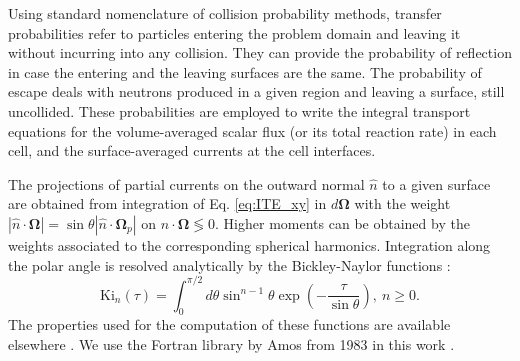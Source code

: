\documentclass{ictt26}
\begin{document}
Using standard nomenclature of collision probability methods, transfer probabilities refer to particles entering the problem domain and leaving it without incurring into any collision. They can provide the probability of reflection in case the entering and the leaving surfaces are the same. The probability of escape deals with neutrons produced in a given region and leaving a surface, still uncollided. These probabilities are employed to write the integral transport equations for the volume-averaged scalar flux (or its total reaction rate) in each cell, and the surface-averaged currents at the cell interfaces.

The projections of partial currents on the outward normal $\hat{n}$ to a given surface are obtained from integration of Eq. \ref{eq:ITE_xy} in $d\mathbf{\Omega}$ with the weight $| \hat{n} \cdot \mathbf{\Omega} | = \sin \theta | \hat{n} \cdot \mathbf{\Omega}_p |$ on $\hat{n} \cdot \mathbf{\Omega} \lessgtr 0$. Higher moments can be obtained by the weights associated to the corresponding spherical harmonics. Integration along the polar angle is resolved analytically by the Bickley-Naylor functions \cite{amos1983uniform}:
\begin{equation}
\text{Ki}_n(\tau) = \int_0^{\pi/2}{ d\theta \sin^{n-1} \theta \exp\left(-\frac{\tau}{\sin \theta}\right) },\: n \geq 0.
\label{eq:Kin}
\end{equation}
The properties used for the computation of these functions are available elsewhere \cite{lewis1984computational,hebert2009applied}. We use the Fortran library by Amos from 1983 in this work \cite{amos1983algorithm}.
\end{document}
